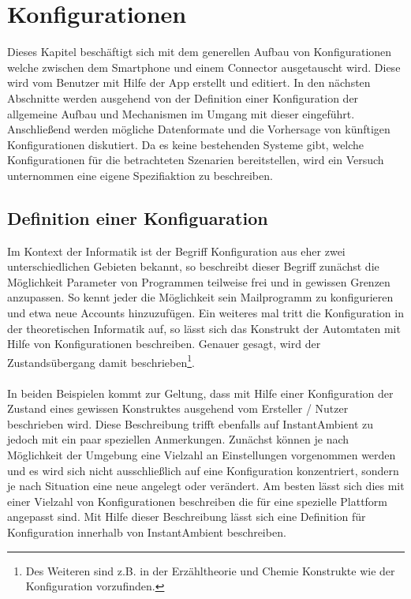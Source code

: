 \chapter{Konfigurationen}

Dieses Kapitel beschäftigt sich mit dem generellen Aufbau von Konfigurationen welche zwischen dem Smartphone und einem Connector ausgetauscht wird. Diese wird vom Benutzer
mit Hilfe der App erstellt und editiert. In den nächsten Abschnitte werden ausgehend von der Definition einer Konfiguration der allgemeine Aufbau und Mechanismen im Umgang
mit dieser eingeführt. Anschließend werden mögliche Datenformate und die Vorhersage von künftigen Konfigurationen diskutiert. Da es keine bestehenden Systeme gibt, welche 
Konfigurationen für die betrachteten Szenarien bereitstellen, wird ein Versuch unternommen eine eigene Spezifiaktion zu beschreiben.


\section{Definition einer Konfiguaration}
Im Kontext der Informatik ist der Begriff Konfiguration aus eher zwei unterschiedlichen Gebieten bekannt, so beschreibt dieser Begriff zunächst die Möglichkeit Parameter von
Programmen teilweise frei und in gewissen Grenzen anzupassen. So kennt jeder die Möglichkeit sein Mailprogramm zu konfigurieren und etwa neue Accounts hinzuzufügen. 
Ein weiteres mal tritt die Konfiguration in der theoretischen Informatik auf, so lässt sich das Konstrukt der Automtaten mit Hilfe von Konfigurationen beschreiben. Genauer
gesagt, wird der Zustandsübergang damit beschrieben\footnote{Des Weiteren sind z.B. in der Erzähltheorie und Chemie Konstrukte wie der Konfiguration vorzufinden. }. 
\\\\
In beiden Beispielen kommt zur Geltung, dass mit Hilfe einer Konfiguration der Zustand eines gewissen Konstruktes ausgehend vom Ersteller / Nutzer beschrieben wird. Diese
Beschreibung trifft ebenfalls auf InstantAmbient zu jedoch mit ein paar speziellen Anmerkungen. Zunächst können je nach Möglichkeit der Umgebung eine Vielzahl an 
Einstellungen vorgenommen werden und es wird sich nicht ausschließlich auf eine Konfiguration konzentriert, sondern je nach Situation eine neue angelegt oder verändert. Am 
besten lässt sich dies mit einer Vielzahl von Konfigurationen beschreiben die für eine spezielle Plattform angepasst sind. Mit Hilfe dieser Beschreibung lässt sich eine Definition für Konfiguration innerhalb von InstantAmbient beschreiben.

